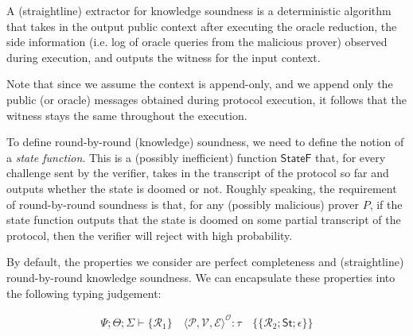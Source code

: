 A (straightline) extractor for knowledge soundness is a deterministic algorithm that takes in the output public context after executing the oracle reduction, the side information (i.e. log of oracle queries from the malicious prover) observed during execution, and outputs the witness for the input context.

Note that since we assume the context is append-only, and we append only the public (or oracle)
messages obtained during protocol execution, it follows that the witness stays the same throughout
the execution.

\begin{definition}
    \label{def:knowledge_soundness}
\end{definition}

To define round-by-round (knowledge) soundness, we need to define the notion of a \emph{state function}. This is a (possibly inefficient) function $\mathsf{StateF}$ that, for every challenge sent by the verifier, takes in the transcript of the protocol so far and outputs whether the state is doomed or not. Roughly speaking, the requirement of round-by-round soundness is that, for any (possibly malicious) prover $P$, if the state function outputs that the state is doomed on some partial transcript of the protocol, then the verifier will reject with high probability.

\begin{definition}
    \label{def:state_function}
\end{definition}

\begin{definition}
    \label{def:round_by_round_soundness}
\end{definition}

\begin{definition}
    \label{def:round_by_round_knowledge_soundness}
\end{definition}

By default, the properties we consider are perfect completeness and (straightline) round-by-round knowledge soundness. We can encapsulate these properties into the following typing judgement:

\begin{align}
    \Psi; \Theta; \varSigma \vdash \{\mathcal{R}_1\} \quad \langle\mathcal{P}, \mathcal{V}, \mathcal{E}\rangle^{\mathcal{O}} : \tau \quad \{\!\{\mathcal{R}_2; \mathsf{St}; \epsilon\}\!\}
\end{align}

